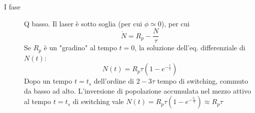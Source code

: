 \begin{description}
\item [I fase] Q basso.
Il laser è sotto soglia (per cui $\phi \simeq 0$), per cui
\begin{equation*}
\dot{N} = R_p -\frac{N}{\tau}
\end{equation*}
Se $R_p$ è un "gradino" al tempo $t=0$, la soluzione dell'eq. differenziale di $N(t)$:
\begin{equation*}
N(t) = R_p\tau\left(1 - e^{-\frac{t}{\tau}}\right)
\end{equation*}
Dopo un tempo $t=t_s$ dell'ordine di $2-3 \tau$ tempo di switching, commuto da basso ad alto. L'inversione di popolazione accumulata nel mezzo attivo al tempo $t=t_s$ di switching vale $N(t) = R_p\tau\left(1 - e^{-\frac{t_s}{\tau}}\right) \approx R_p\tau$\\


\end{description}
